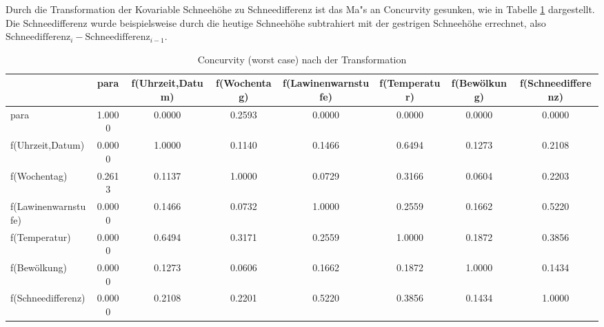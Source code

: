 \documentclass[12pt]{scrreprt}
\begin{document}
\noindent Durch die Transformation der Kovariable Schneehöhe zu Schneedifferenz ist das Ma"s an Concurvity gesunken, wie in Tabelle \ref{con2} dargestellt. Die Schneedifferenz wurde beispielsweise durch die heutige Schneehöhe subtrahiert mit der gestrigen Schneehöhe errechnet, also
$\text{Schneedifferenz}_{i}-\text{Schneedifferenz}_{i-1}$.

\begin{table}[htbp]
	\centering
	\caption{Concurvity (worst case) nach der Transformation}
	\begin{adjustbox}{max width=\textwidth}
	\begin{tabular}{lccccccc}
		& para & f(Uhrzeit,Datum) & f(Wochentag) & f(Lawinenwarnstufe) & f(Temperatur) & f(Bewölkung) & f(Schneedifferenz) \\
		\midrule
		\midrule
		para  & 1.0000 & 0.0000 & 0.2593 & 0.0000 & 0.0000 & 0.0000 & 0.0000 \\
		f(Uhrzeit,Datum) & 0.0000 & 1.0000 & 0.1140 & 0.1466 & 0.6494 & 0.1273 & \cellcolor{blue!25}0.2108 \\
		f(Wochentag) & 0.2613 & 0.1137 & 1.0000 & 0.0729 & 0.3166 & 0.0604 & 0.2203 \\
		f(Lawinenwarnstufe) & 0.0000 & 0.1466 & 0.0732 & 1.0000 & 0.2559 & 0.1662 & 0.5220 \\
		f(Temperatur) & 0.0000 & 0.6494 & 0.3171 & 0.2559 & 1.0000 & 0.1872 & \cellcolor{blue!25}0.3856 \\
		f(Bewölkung) & 0.0000 & 0.1273 & 0.0606 & 0.1662 & 0.1872 & 1.0000 & 0.1434 \\
		f(Schneedifferenz) & 0.0000 & 0.2108 & 0.2201 & 0.5220 & 0.3856 & 0.1434 & 1.0000 \\
		\bottomrule
	\end{tabular}%
	\label{con2}%
	\end{adjustbox}
\end{table}%

\newpage
\end{document}
